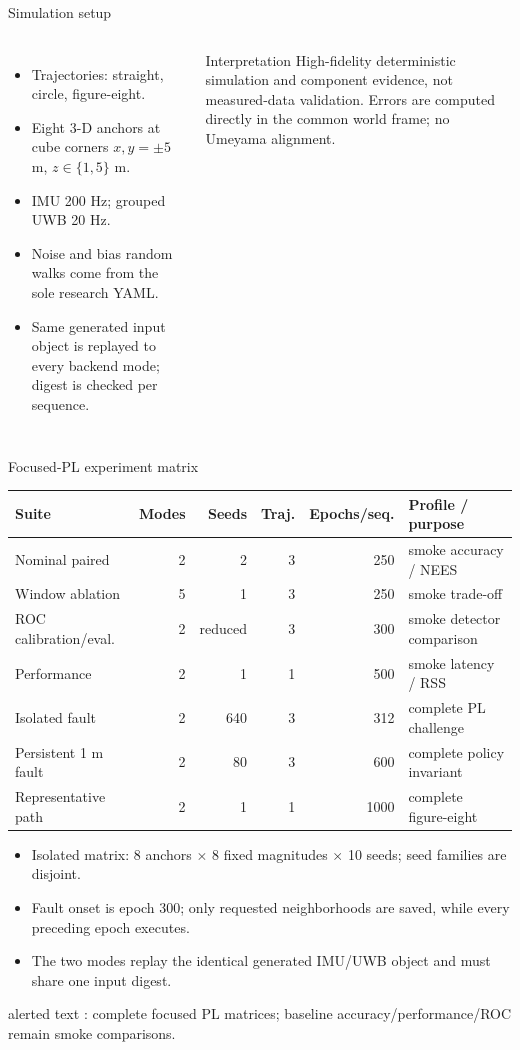 \documentclass[aspectratio=169,10pt]{beamer}
\newcommand{\profilewarning}{%
  \begin{beamercolorbox}[sep=.45ex,center]{alerted text}
  \scriptsize \textbf{\ExecutionProfile}: complete focused PL matrices; baseline accuracy/performance/ROC remain smoke comparisons.
  \end{beamercolorbox}}
\begin{document}
\begin{frame}{Simulation setup}
\begin{columns}[T]
\begin{itemize}
\item Trajectories: straight, circle, figure-eight.
\item Eight 3-D anchors at cube corners $x,y=\pm5$ m, $z\in\{1,5\}$ m.
\item IMU 200 Hz; grouped UWB 20 Hz.
\item Noise and bias random walks come from the sole research YAML.
\item Same generated input object is replayed to every backend mode; digest is checked per sequence.
\end{itemize}
\begin{alertblock}{Interpretation}
High-fidelity deterministic simulation and component evidence, not measured-data validation. Errors are computed directly in the common world frame; no Umeyama alignment.
\end{alertblock}
\end{columns}
\end{frame}

\begin{frame}{Focused-PL experiment matrix}
\scriptsize
\begin{tabular}{lrrrrl}
\toprule
Suite & Modes & Seeds & Traj. & Epochs/seq. & Profile / purpose\\
\midrule
Nominal paired & 2 & 2 & 3 & 250 & smoke accuracy / NEES\\
Window ablation & 5 & 1 & 3 & 250 & smoke trade-off\\
ROC calibration/eval. & 2 & reduced & 3 & 300 & smoke detector comparison\\
Performance & 2 & 1 & 1 & 500 & smoke latency / RSS\\
Isolated fault & 2 & 640 & 3 & 312 & complete PL challenge\\
Persistent 1 m fault & 2 & 80 & 3 & 600 & complete policy invariant\\
Representative path & 2 & 1 & 1 & 1000 & complete figure-eight\\
\bottomrule
\end{tabular}
\vspace{.5em}
\begin{itemize}
\item Isolated matrix: 8 anchors $\times$ 8 fixed magnitudes $\times$ 10 seeds; seed families are disjoint.
\item Fault onset is epoch 300; only requested neighborhoods are saved, while every preceding epoch executes.
\item The two modes replay the identical generated IMU/UWB object and must share one input digest.
\end{itemize}
\profilewarning
\end{frame}
\end{document}
